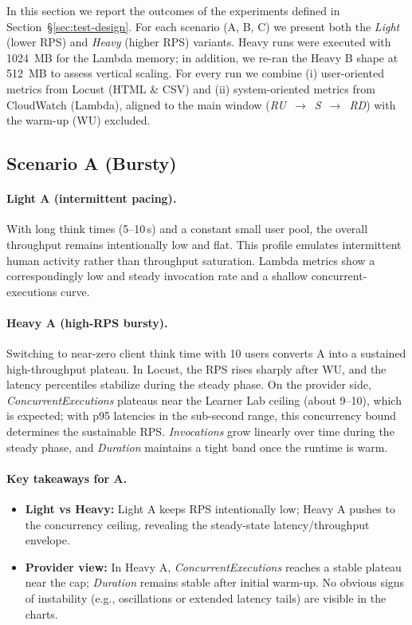 \documentclass[11pt,a4paper]{article}
\begin{document}
In this section we report the outcomes of the experiments defined in Section~\S\ref{sec:test-design}. For each scenario (A, B, C) we present both the \emph{Light} (lower RPS) and \emph{Heavy} (higher RPS) variants. Heavy runs were executed with \SI{1024}{MB} for the Lambda memory; in addition, we re-ran the Heavy B shape at \SI{512}{MB} to assess vertical scaling. For every run we combine (i) user-oriented metrics from Locust (HTML \& CSV) and (ii) system-oriented metrics from CloudWatch (Lambda), aligned to the main window (\emph{RU}~$\rightarrow$~\emph{S}~$\rightarrow$~\emph{RD}) with the warm-up (WU) excluded.

\subsection{Scenario A (Bursty)}\label{subsec:resA}

\paragraph{Light A (intermittent pacing).}
With long think times (5--10\,s) and a constant small user pool, the overall throughput remains intentionally low and flat. This profile emulates intermittent human activity rather than throughput saturation. Lambda metrics show a correspondingly low and steady invocation rate and a shallow concurrent-executions curve.

\paragraph{Heavy A (high-RPS bursty).}
Switching to near-zero client think time with 10 users converts A into a sustained high-throughput plateau. In Locust, the RPS rises sharply after WU, and the latency percentiles stabilize during the steady phase. On the provider side, \emph{ConcurrentExecutions} plateaus near the Learner Lab ceiling (about 9--10), which is expected; with p95 latencies in the sub-second range, this concurrency bound determines the sustainable RPS. \emph{Invocations} grow linearly over time during the steady phase, and \emph{Duration} maintains a tight band once the runtime is warm.

\paragraph{Key takeaways for A.}
\begin{itemize}
  \item \textbf{Light vs Heavy:} Light A keeps RPS intentionally low; Heavy A pushes to the concurrency ceiling, revealing the steady-state latency/throughput envelope.
  \item \textbf{Provider view:} In Heavy A, \emph{ConcurrentExecutions} reaches a stable plateau near the cap; \emph{Duration} remains stable after initial warm-up. No obvious signs of instability (e.g., oscillations or extended latency tails) are visible in the charts.
\end{itemize}
\end{document}

